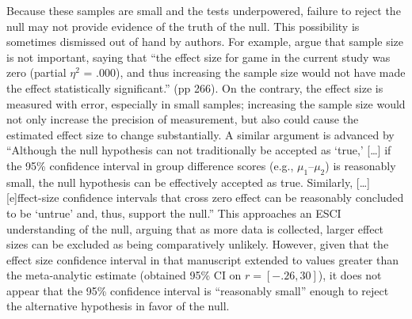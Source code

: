 \documentclass[man]{apa6}
\begin{document}
Because these samples are small and the tests underpowered, failure to reject the null may not provide evidence of the truth of the null.  This possibility is sometimes dismissed out of hand by authors. For example, \citet{Adachi:Willoughby:2011} argue that sample size is not important, saying that ``the effect size for game in the current study was zero (partial $\eta^2$ = .000), and thus increasing the sample size would not have made the effect statistically significant.'' (pp 266).  On the contrary, the effect size is measured with error, especially in small samples; increasing the sample size would not only increase the precision of measurement, but also could cause the estimated effect size to change substantially. A similar argument is advanced by \citet{Ferguson:etal:2008} %
``Although the null hypothesis can not traditionally be accepted as `true,' [\ldots] if the 95\% confidence interval in group difference scores (e.g., $\mu_1 – \mu_2$) is reasonably small, the null hypothesis can be effectively accepted as true. Similarly, [\ldots] [e]ffect-size confidence intervals that cross zero effect can be reasonably concluded to be ‘untrue' and, thus, support the null.'' This approaches an ESCI understanding of the null, arguing that as more data is collected, larger effect sizes can be excluded as being comparatively unlikely. However, given that the effect size confidence interval in that manuscript extended to values greater than the meta-analytic estimate (obtained 95\% CI on $r = [-.26, 30]$), it does not appear that the 95\% confidence interval is ``reasonably small'' enough to reject the alternative hypothesis in favor of the null.
\end{document}
